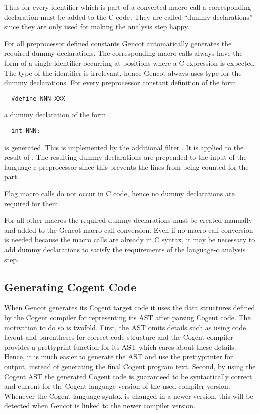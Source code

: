 Thus for every identifier which is part of a converted macro call a corresponding declaration must be added to the 
C code. They are called ``dummy declarations'' since they are only used for making the analysis step happy. 

For all preprocessor defined constants Gencot automatically generates the required dummy declarations. The corresponding
macro calls always have the form of a single identifier occurring at positions where a C expression is expected. The type
of the identifier is irrelevant, hence Gencot always uses type  for the dummy declarations. For every preprocessor
constant definition of the form 
\begin{verbatim}
  #define NNN XXX
\end{verbatim}
a dummy declaration of the form
\begin{verbatim}
  int NNN;
\end{verbatim}
is generated. This is implemented by the additional filter . It is applied to the result of 
. The resulting dummy declarations are prepended to the input of the language-c preprocessor
since this prevents the lines from being counted for the  part.

Flag macro calls do not occur in C code, hence no dummy declarations are required for them.

For all other macros the required dummy declarations must be created manually and added to the Gencot macro call conversion.
Even if no macro call conversion is needed because the macro calls are already in C syntax, it may be necessary to
add dummy declarations to satisfy the requirements of the language-c analysis step.

\subsection{Generating Cogent Code}
\label{impl-ccode-gencog}

When Gencot generates its Cogent target code it uses the data structures defined by the Cogent compiler for representing
its AST after parsing Cogent code. The motivation to do so is twofold. First, the AST omits details such as using code layout
and parentheses for correct code structure and the Cogent compiler provides a prettyprint function for its AST which cares
about these details. Hence, it is much easier to generate the AST and use the prettyprinter for output, instead of generating
the final Cogent program text. Second, by using the Cogent AST the generated Cogent code is guaranteed to be syntactically correct and
current for the Cogent language version of the used compiler version. Whenever the Cogent language syntax is changed
in a newer version, this will be detected when Gencot is linked to the newer compiler version.

